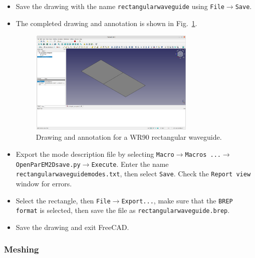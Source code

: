 \documentclass[titlepage]{article}
\renewcommand\_{\textunderscore\linebreak[1]}
\begin{document}
\begin{itemize}
\item Save the drawing with the name \texttt{rectangular\_waveguide} using \texttt{File}$\rightarrow$\texttt{Save}.
\item The completed drawing and annotation is shown in Fig.~\ref{fig:rectangular_waveguide}.
\begin{figure}
  \centering
  \includegraphics[width=0.75\textwidth]{../tutorials/OpenParEM2D/rectangular_waveguide/screenshots/rectangular_waveguide}
  \caption{Drawing and annotation for a WR90 rectangular waveguide.}
  \label{fig:rectangular_waveguide}
\end{figure}
\item Export the mode description file by selecting \texttt{Macro}$\rightarrow$\texttt{Macros ...}$\rightarrow$\texttt{OpenParEM2D\_save.py}$\rightarrow$\texttt{Execute}.  Enter the name \texttt{rectangular\_waveguide\_modes.txt}, then select \texttt{Save}.  Check the \texttt{Report view} window for errors.
\item Select the rectangle, then \texttt{File}$\rightarrow$\texttt{Export...}, make sure that the \texttt{BREP format} is selected, then save the file as \texttt{rectangular\_waveguide.brep}.
\item Save the drawing and exit FreeCAD.
\end{itemize}

\subsubsection{Meshing}
\end{document}
